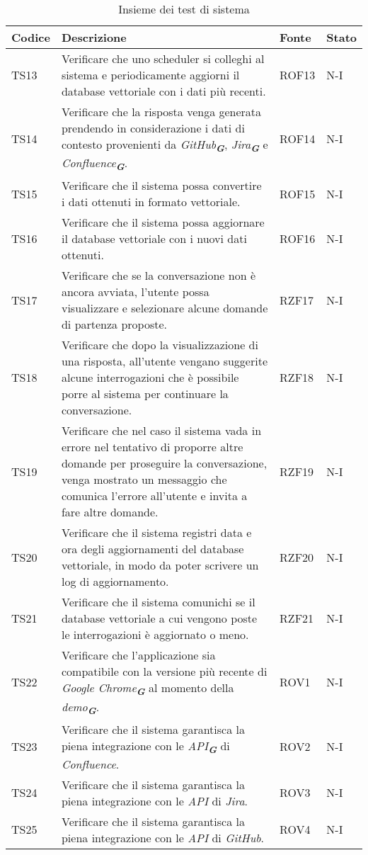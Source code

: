 \begin{table}[h!]
    \centering
    \renewcommand{\arraystretch}{1.5}
    \begin{tabularx}{\textwidth}{|p{}|X|p{}|p{}|}\hline
    \rowcolor[HTML]{FFD700}
    \textbf{Codice} & \textbf{Descrizione} & \textbf{Fonte} & \textbf{Stato} \\ \hline
    TS13 & Verificare che uno scheduler si colleghi al sistema e periodicamente aggiorni il database vettoriale con i dati più recenti. & ROF13 & N-I \\ \hline
    TS14 & Verificare che la risposta venga generata prendendo in considerazione i dati di contesto provenienti da \emph{GitHub}\textsubscript{\textit{\textbf{G}}}, \emph{Jira}\textsubscript{\textit{\textbf{G}}} e \emph{Confluence}\textsubscript{\textit{\textbf{G}}}. & ROF14 & N-I \\ \hline
    TS15 & Verificare che il sistema possa convertire i dati ottenuti in formato vettoriale. & ROF15 & N-I \\ \hline
    TS16 & Verificare che il sistema possa aggiornare il database vettoriale con i nuovi dati ottenuti. & ROF16 & N-I \\ \hline
    TS17 & Verificare che se la conversazione non è ancora avviata, l'utente possa visualizzare e selezionare alcune domande di partenza proposte. & RZF17 & N-I \\ \hline
    TS18 & Verificare che dopo la visualizzazione di una risposta, all'utente vengano suggerite alcune interrogazioni che è possibile porre al sistema per continuare la conversazione. & RZF18 & N-I \\ \hline
    TS19 & Verificare che nel caso il sistema vada in errore nel tentativo di proporre altre domande per proseguire la conversazione, venga mostrato un messaggio che comunica l'errore all'utente e invita a fare altre domande. & RZF19 & N-I \\ \hline
    TS20 & Verificare che il sistema registri data e ora degli aggiornamenti del database vettoriale, in modo da poter scrivere un log di aggiornamento. & RZF20 & N-I \\ \hline
    TS21 & Verificare che il sistema comunichi se il database vettoriale a cui vengono poste le interrogazioni è aggiornato o meno. & RZF21 & N-I \\ \hline
    TS22 & Verificare che l'applicazione sia compatibile con la versione più recente di \emph{Google Chrome}\textsubscript{\textit{\textbf{G}}} al momento della \emph{demo}\textsubscript{\textit{\textbf{G}}}. & ROV1 & N-I \\ \hline
    TS23 & Verificare che il sistema garantisca la piena integrazione con le \emph{API}\textsubscript{\textit{\textbf{G}}} di \emph{Confluence}. & ROV2 & N-I \\ \hline
    TS24 & Verificare che il sistema garantisca la piena integrazione con le \emph{API} di \emph{Jira}. & ROV3 & N-I \\ \hline
    TS25 & Verificare che il sistema garantisca la piena integrazione con le \emph{API} di \emph{GitHub}. & ROV4 & N-I \\ \hline
    \end{tabularx}
    \caption{Insieme dei test di sistema}
\end{table}
